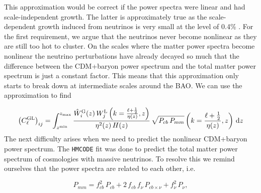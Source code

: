 \documentclass[../main.tex]{subfiles}
\begin{document}
This approximation would be correct if the power spectra were linear and had scale-independent growth. The latter is approximately true as the scale-dependent growth induced from neutrinos is very small at the level of 0.4\% \cite{Euclid:2019clj}. For the first requirement, we argue that the neutrinos never become nonlinear as they are still too hot to cluster.  On the scales where the matter power spectra become nonlinear the neutrino perturbations have already decayed so much that the difference between the CDM+baryon power spectrum and the total matter power spectrum is just a constant factor. This means that this approximation only starts to break down at intermediate scales around the BAO. We can use the approximation to find 

\begin{equation}
    \left(C^\mathrm{GL}_{\ell}\right)_{ij} = \int_{z^\mathrm{min}}^{z_\mathrm{max}} \frac{\hat{W}^\mathrm{G}_i(z)\,W^\mathrm{L}_j\left(k=\frac{\ell+\frac{1}{2}}{\eta(z)},z\right)}{\eta^2(z)\,H(z)}\,\sqrt{P_{cb}\,P_{mm}}\left(k=\frac{\ell+\frac{1}{2}}{\eta(z)},z\right)\,\mathrm{d} z
\end{equation}
The next difficulty arises when we need to predict the nonlinear CDM+baryon power spectrum. The {\tt HMCODE} fit was done to predict the total matter power spectrum of cosmologies with massive neutrinos. To resolve this we remind ourselves that the power spectra are related to each other, i.e. 

\begin{equation}
    P_{mm} = f_{cb}^2\,P_{cb}+2\,f_{cb}\,f_\nu\,P_{cb\times\nu}+f_{\nu}^2\,P_{\nu},
\end{equation} 
\end{document}
